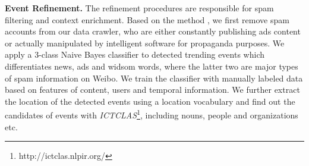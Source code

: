 \noindent\textbf{Event Refinement.}
\label{refinement}
The refinement procedures are responsible for spam filtering and context enrichment.
Based on the method \cite{liu2013many}, we first remove spam accounts from our data crawler,
who are either constantly publishing ads content or actually manipulated by intelligent software for propaganda purposes.
We apply a 3-class Naive Bayes classifier to detected trending events which differentiates news, ads and widsom words,
where the latter two are major types of spam information on Weibo.
We train the classifier with manually labeled data based on features of content, users and temporal information.
We further extract the location of the detected events using a location vocabulary
and find out the candidates of events with \emph{ICTCLAS}\footnote{http://ictclas.nlpir.org/}, including nouns, people and organizations etc.

